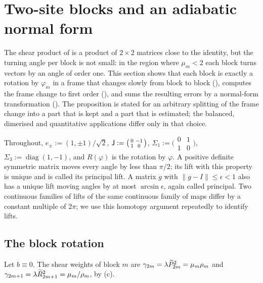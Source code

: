 \section{Two-site blocks and an adiabatic normal form}\label{sec:blocks}

The shear product of  is a product of $2\times2$ matrices close to the
identity, but the turning angle per block is not small: in the region where
$\mu_m<2$ each block turns vectors by an angle of order one. This section shows that
each block is exactly a rotation by $\varphi_m$ in a frame that changes slowly from
block to block (), computes the frame change to first order
(), and sums the resulting errors by a normal-form transformation
(). The proposition is stated for an arbitrary splitting of the
frame change into a part that is kept and a part that is estimated; the balanced,
dimerised and quantitative applications differ only in that choice.

Throughout, $e_\pm:=(1,\pm1)/\sqrt2$, $\mathsf{J}:=\bigl(\begin{smallmatrix}0&-1\\1&0\end{smallmatrix}\bigr)$,
$\Sigma_1:=\bigl(\begin{smallmatrix}0&1\\1&0\end{smallmatrix}\bigr)$,
$\Sigma_3:=\operatorname{diag}(1,-1)$, and $R(\varphi)$ is the rotation by $\varphi$. A
positive definite symmetric matrix moves every angle by less than $\pi/2$; its lift
with this property is unique and is called its principal lift. A matrix $g$ with
$\|g-I\|\le\epsilon<1$ also has a unique lift moving angles by at most
$\arcsin\epsilon$, again called principal. Two continuous families of lifts of the
same continuous family of maps differ by a constant multiple of $2\pi$; we use this
homotopy argument repeatedly to identify lifts.

\subsection{The block rotation}

Let $b\equiv0$. The shear weights of block $m$ are $\gamma_{2m}=\lambda\widetilde P_{2m}^2=\mu_m\rho_m$
and $\gamma_{2m+1}=\lambda\widetilde R_{2m+1}^2=\mu_m/\rho_m$, by (c).

